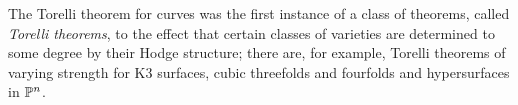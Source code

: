 The Torelli theorem for curves was the first instance of a class of theorems, called \emph{Torelli theorems}, to the effect that certain classes of varieties are determined to some degree by their Hodge structure; there are, for example, Torelli theorems of varying strength for K3 surfaces, cubic threefolds and fourfolds and hypersurfaces in ${\mathbb P}^n$.



